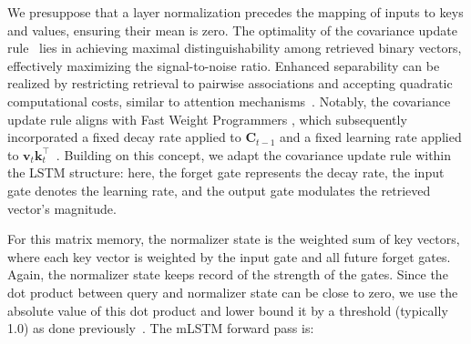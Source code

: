 We presuppose that a layer normalization precedes the mapping of inputs to keys and values, ensuring their mean is zero. The optimality of the covariance update rule~\citep{Dayan:91} lies in achieving maximal distinguishability among retrieved binary vectors, effectively maximizing the signal-to-noise ratio. Enhanced separability can be realized by restricting retrieval to pairwise associations and accepting quadratic computational costs, similar to attention mechanisms~\citep{Krotov:16,Krotov:17,Ramsauer:21}. Notably, the covariance update rule aligns with Fast Weight Programmers \citep{Schmidhuber:92ncfastweights,Schlag:21}, which subsequently incorporated a fixed decay rate applied to $\mathbf{C}_{t-1}$ and a fixed learning rate applied to 
$\mathbf{v}_{t} \mathbf{k}_t ^\top$~\citep{Ba:16}.
Building on this concept, we adapt the covariance update rule within the LSTM structure: here, the forget gate represents the decay rate, the input gate denotes the learning rate, and the output gate modulates the retrieved vector's magnitude.

For this matrix memory, the normalizer state is the weighted sum of key vectors, where each key vector is weighted by the input gate and all future forget gates. Again, the normalizer state keeps record of the strength of the gates. Since the dot product between query and normalizer state can be close to zero, we use the absolute value of this dot product and lower bound it by a threshold (typically 1.0) as done previously~\citep{Sun:23arxiv}. The mLSTM forward pass is:

